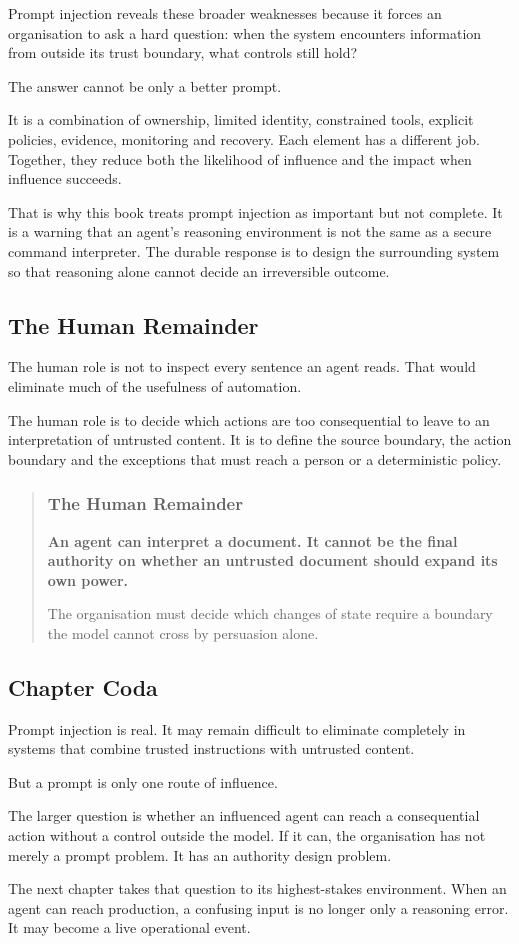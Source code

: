 Prompt injection reveals these broader weaknesses because it forces an
organisation to ask a hard question: when the system encounters
information from outside its trust boundary, what controls still hold?

The answer cannot be only a better prompt.

It is a combination of ownership, limited identity, constrained tools,
explicit policies, evidence, monitoring and recovery. Each element has a
different job. Together, they reduce both the likelihood of influence
and the impact when influence succeeds.

That is why this book treats prompt injection as important but not
complete. It is a warning that an agent's reasoning environment is not
the same as a secure command interpreter. The durable response is to
design the surrounding system so that reasoning alone cannot decide an
irreversible outcome.

\subsection{The Human Remainder}\label{the-human-remainder}

The human role is not to inspect every sentence an agent reads. That
would eliminate much of the usefulness of automation.

The human role is to decide which actions are too consequential to leave
to an interpretation of untrusted content. It is to define the source
boundary, the action boundary and the exceptions that must reach a
person or a deterministic policy.

\begin{quote}
\subsubsection{The Human Remainder}\label{the-human-remainder-1}

\textbf{An agent can interpret a document. It cannot be the final
authority on whether an untrusted document should expand its own power.}

The organisation must decide which changes of state require a boundary
the model cannot cross by persuasion alone.
\end{quote}

\subsection{Chapter Coda}\label{chapter-coda}

Prompt injection is real. It may remain difficult to eliminate
completely in systems that combine trusted instructions with untrusted
content.

But a prompt is only one route of influence.

The larger question is whether an influenced agent can reach a
consequential action without a control outside the model. If it can, the
organisation has not merely a prompt problem. It has an authority design
problem.

The next chapter takes that question to its highest-stakes environment.
When an agent can reach production, a confusing input is no longer only
a reasoning error. It may become a live operational event.
